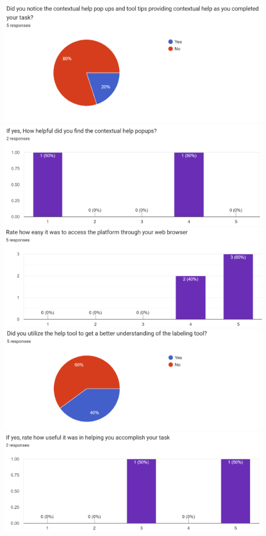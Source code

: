 \documentclass[12pt, titlepage]{article}
\begin{document}
\begin{centering}
\includegraphics[scale=0.7]{chart (6).png}\\
\includegraphics[scale=0.7]{chart (7).png}\\
\includegraphics[scale=0.7]{chart (8).png}\\
\includegraphics[scale=0.7]{chart (9).png}\\
\includegraphics[scale=0.7]{chart (10).png}\\

\end{centering}
\end{document}
